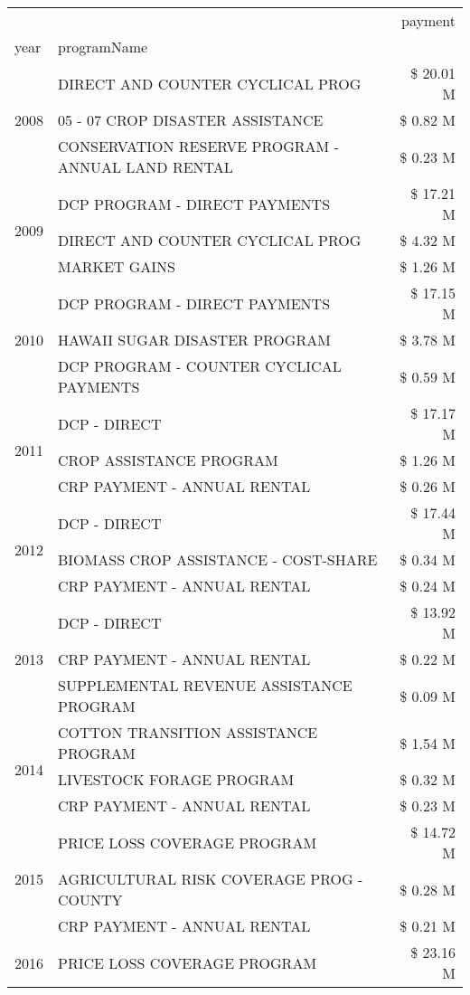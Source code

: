\begin{tabular}{llr}
\toprule
 &  & payment \\
year & programName &  \\
\midrule
\multirow[t]{3}{*}{2008} & DIRECT AND COUNTER CYCLICAL PROG & \$ 20.01 M \\
 & 05 - 07 CROP DISASTER ASSISTANCE & \$ 0.82 M \\
 & CONSERVATION RESERVE PROGRAM - ANNUAL LAND RENTAL & \$ 0.23 M \\
\cline{1-3}
\multirow[t]{3}{*}{2009} & DCP PROGRAM - DIRECT PAYMENTS & \$ 17.21 M \\
 & DIRECT AND COUNTER CYCLICAL PROG & \$ 4.32 M \\
 & MARKET GAINS & \$ 1.26 M \\
\cline{1-3}
\multirow[t]{3}{*}{2010} & DCP PROGRAM - DIRECT PAYMENTS & \$ 17.15 M \\
 & HAWAII SUGAR DISASTER PROGRAM & \$ 3.78 M \\
 & DCP PROGRAM - COUNTER CYCLICAL PAYMENTS & \$ 0.59 M \\
\cline{1-3}
\multirow[t]{3}{*}{2011} & DCP - DIRECT & \$ 17.17 M \\
 & CROP ASSISTANCE PROGRAM & \$ 1.26 M \\
 & CRP PAYMENT - ANNUAL RENTAL & \$ 0.26 M \\
\cline{1-3}
\multirow[t]{3}{*}{2012} & DCP - DIRECT & \$ 17.44 M \\
 & BIOMASS CROP ASSISTANCE - COST-SHARE & \$ 0.34 M \\
 & CRP PAYMENT - ANNUAL RENTAL & \$ 0.24 M \\
\cline{1-3}
\multirow[t]{3}{*}{2013} & DCP - DIRECT & \$ 13.92 M \\
 & CRP PAYMENT - ANNUAL RENTAL & \$ 0.22 M \\
 & SUPPLEMENTAL REVENUE ASSISTANCE PROGRAM & \$ 0.09 M \\
\cline{1-3}
\multirow[t]{3}{*}{2014} & COTTON TRANSITION ASSISTANCE PROGRAM & \$ 1.54 M \\
 & LIVESTOCK FORAGE PROGRAM & \$ 0.32 M \\
 & CRP PAYMENT - ANNUAL RENTAL & \$ 0.23 M \\
\cline{1-3}
\multirow[t]{3}{*}{2015} & PRICE LOSS COVERAGE PROGRAM & \$ 14.72 M \\
 & AGRICULTURAL RISK COVERAGE PROG - COUNTY & \$ 0.28 M \\
 & CRP PAYMENT - ANNUAL RENTAL & \$ 0.21 M \\
\cline{1-3}
\multirow[t]{3}{*}{2016} & PRICE LOSS COVERAGE PROGRAM                   & \$ 23.16 M \\

\end{tabular}
